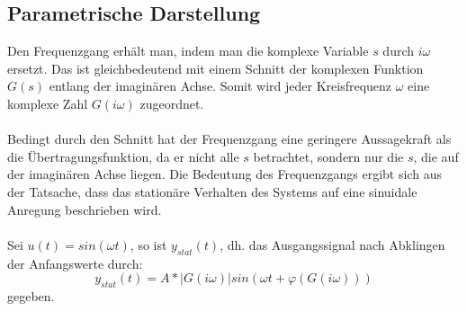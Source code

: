 \subsection{Parametrische Darstellung}
Den Frequenzgang erhält man, indem man die komplexe Variable $s$ durch $i\omega$ ersetzt. Das ist gleichbedeutend mit einem Schnitt der komplexen Funktion $G(s)$ entlang der imaginären Achse. Somit wird jeder Kreisfrequenz $\omega$ eine komplexe Zahl $G(i\omega)$ zugeordnet. 
\\
\\
Bedingt durch den Schnitt hat der Frequenzgang eine geringere Aussagekraft als die Übertragungsfunktion, da er nicht alle $s$ betrachtet, sondern nur die $s$, die auf der imaginären Achse liegen.
Die Bedeutung des Frequenzgangs ergibt sich aus der Tatsache, dass das stationäre Verhalten des Systems auf eine sinuidale Anregung beschrieben wird.\\
\\
Sei $u(t) = sin(\omega t)$, so ist $y_{stat}(t)$, dh. das Ausgangssignal nach Abklingen der Anfangswerte durch:
\begin{equation*}
    y_{stat}(t)=A*|G(i\omega )|sin(\omega t + \varphi (G(i\omega )))
\end{equation*}
gegeben. 

